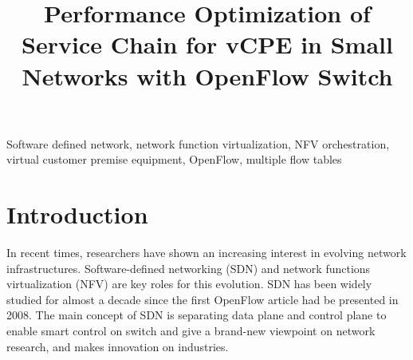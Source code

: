 \documentclass[conference]{IEEEtran}
\begin{document}
\title{Performance Optimization of Service Chain for vCPE in Small Networks with OpenFlow Switch}

\author{

}

\maketitle

\begin{abstract}
\end{abstract}

\begin{IEEEkeywords}
Software defined network, network function virtualization, NFV orchestration, virtual customer premise equipment, OpenFlow, multiple flow tables
\end{IEEEkeywords}

\IEEEpeerreviewmaketitle{}


\section{Introduction}
In recent times, researchers have shown an increasing interest in evolving network infrastructures.
Software-defined networking (SDN) and network functions virtualization (NFV) are key roles for this evolution.
SDN \cite{sdn-mckeown-2009-talk, sdn-newnorm, sdn-road, sdn-compre-survey} has been widely studied for almost a decade since the first OpenFlow \cite{openflow-mckeown-2008, openflow-spec} article had be presented in 2008.
The main concept of SDN is separating data plane and control plane to enable smart control on switch and give a brand-new viewpoint on network research, and makes innovation on industries.
\end{document}
